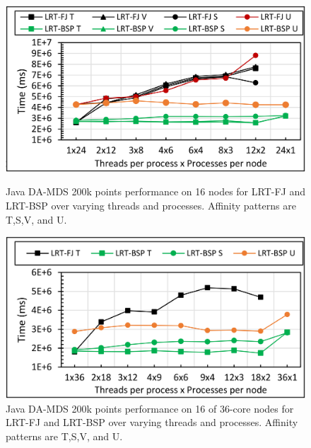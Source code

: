\documentclass[10pt, conference, compsocconf]{IEEEtran}
\begin{document}
\begin{figure}[!htb]
	\begin{minipage}{0.49\textwidth}
        \centering
        \includegraphics[width=1\columnwidth]{images/fig_damds_200k_binding_patterns}
        \caption{Java DA-MDS 200k points performance on 16 nodes for \ac{LRT-FJ} and \ac{LRT-BSP} over varying threads and processes. Affinity patterns are T,S,V, and U.}
        \label{fig:fig_damds_200k_binding_patterns}
    \end{minipage}
    \hspace{1.4mm}
    \begin{minipage}{0.49\textwidth}
        \centering
        \includegraphics[width=1\columnwidth]{images/fig_damds_200k_binding_patterns_on_36core_nodes}
        \caption{Java DA-MDS 200k points performance on 16 of 36-core nodes for \ac{LRT-FJ} and \ac{LRT-BSP} over varying threads and processes. Affinity patterns are T,S,V, and U.}
        \label{fig:fig_damds_200k_binding_patterns_on_36core_nodes}
    \end{minipage}
\end{figure}
\end{document}
